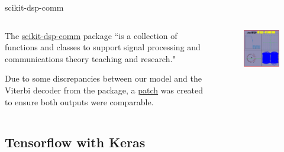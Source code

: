 \documentclass{beamer}
\newcommand{\<}				{\langle}
\renewcommand{\>}      		{\rangle}
\begin{document}
\begin{frame}{scikit-dsp-comm}


\begin{columns}
\begin{column}{0.47\textwidth}
The \href{https://scikit-dsp-comm.readthedocs.io/en/latest/}{scikit-dsp-comm} package ``is a collection of functions and classes to support signal processing and communications theory teaching and research."

\medskip

Due to some discrepancies between our model and the Viterbi decoder from the package, a \href{https://github.com/SupurCalvinHiggins/scikit-dsp-comm.git}{patch} was created to ensure both outputs were comparable. 

\end{column}
\begin{column}{0.47\textwidth}
\begin{figure}[h]
\includegraphics[scale=0.28]{scikit-dsp-comm-logo.png}
\end{figure}
\end{column}
\end{columns}
\end{frame}

\subsection{Tensorflow with Keras} 
\end{document}
